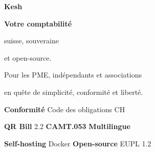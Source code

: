 \documentclass[a4paper,11pt,oneside]{article}
\begin{document}

\begin{titlepage}
    \pagecolor{keshPrimary}\afterpage{\nopagecolor}
    \color{white}

    \vspace*{1.5cm}

    \begin{center}
        \begin{tcolorbox}[%
            enhanced, colback=white, colframe=white,
            width=5cm, height=5cm,
            boxsep=0pt, boxrule=0pt, arc=12pt,
            halign=center, valign=center%
        ]
            \textbf{\color{keshPrimary}\fontsize{60pt}{72pt}\selectfont\sffamily Kesh}
        \end{tcolorbox}

        \vspace{2.5cm}

        {\sffamily\fontsize{40pt}{48pt}\selectfont\bfseries\color{white} Votre comptabilité\par
        \vspace{0.3cm}
        suisse, souveraine\par
        \vspace{0.3cm}
        et open-source.\par}

        \vspace{2cm}

        {\sffamily\Large\color{white}%
        Pour les PME, indépendants et associations\par
        en quête de simplicité, conformité et liberté.\par}

        \vfill

        \begin{tcolorbox}[%
            enhanced, colback=white!10!keshPrimary, colframe=white,
            width=12cm, boxsep=10pt, boxrule=1pt, arc=4pt%
        ]
            \begin{center}
                {\sffamily\large \textbf{Conformité} Code des obligations CH\par
                \vspace{4pt}
                \textbf{QR Bill} 2.2 \quad\textbar\quad
                \textbf{CAMT.053} \quad\textbar\quad
                \textbf{Multilingue}\par
                \vspace{4pt}
                \textbf{Self-hosting} Docker \quad\textbar\quad
                \textbf{Open-source} EUPL 1.2}
            \end{center}
        \end{tcolorbox}


\end{center}
\end{titlepage}
\end{document}
